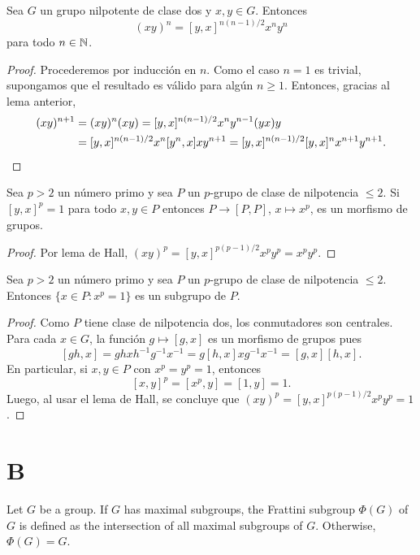 \begin{lemma}[Hall]
	\label{lemma:Hall}
	Sea $G$ un grupo nilpotente de clase dos y $x,y\in G$. Entonces
	\[
		(xy)^n=[y,x]^{n(n-1)/2}x^ny^n
	\]
	para todo $n\in\mathbb{N}$.
\end{lemma}

\begin{proof}
	Procederemos por inducción en $n$. Como el caso $n=1$ es trivial,
	supongamos que el resultado es válido para algún $n\geq1$. Entonces,
	gracias al lema anterior, 
	\begin{align*}
		(xy)^{n+1} &= (xy)^n(xy)=[y,x]^{n(n-1)/2}x^ny^{n-1}(yx)y\\
		&=[y,x]^{n(n-1)/2}x^{n}[y^n,x]xy^{n+1}=[y,x]^{n(n-1)/2}[y,x]^nx^{n+1}y^{n+1}.\qedhere 
	\end{align*}
\end{proof}

\begin{lemma}
	\label{lemma:class2}
	Sea $p>2$ un número primo y sea 
	$P$ un $p$-grupo de clase de nilpotencia $\leq2$. 
	Si $[y,x]^p=1$ para todo $x,y\in P$ entonces $P\to [P,P]$,
	$x\mapsto x^p$, es un morfismo de grupos.
\end{lemma}

\begin{proof}
	Por lema de Hall,
	$(xy)^p=[y,x]^{p(p-1)/2}x^py^p=x^py^p$. 	
\end{proof}

\begin{theorem}
	\label{thm:class2}
	Sea $p>2$ un número primo y sea 
	$P$ un $p$-grupo de clase de nilpotencia $\leq2$. 
	Entonces $\{x\in P:x^p=1\}$ es un subgrupo de $P$.
\end{theorem}

\begin{proof}
	Como $P$ tiene clase de nilpotencia dos, los conmutadores son centrales.
	Para cada $x\in G$, la función $g\mapsto [g,x]$ es un morfismo de grupos
	pues
	\[
		[gh,x]=ghxh^{-1}g^{-1}x^{-1}=g[h,x]xg^{-1}x^{-1}=[g,x][h,x].
	\]
	En particular, si $x,y\in P$ con $x^p=y^p=1$, entonces
	\[
		[x,y]^p=[x^p,y]=[1,y]=1.
	\]
	Luego, al usar el lema de Hall, se concluye que
	$(xy)^p=[y,x]^{p(p-1)/2}x^py^p=1$.
\end{proof}

\section*{B}

Let $G$ be a group. If $G$ has maximal subgroups, the Frattini subgroup
$\Phi(G)$ of $G$ is defined as the intersection of all maximal subgroups of $G$. 
Otherwise, $\Phi(G)=G$.

